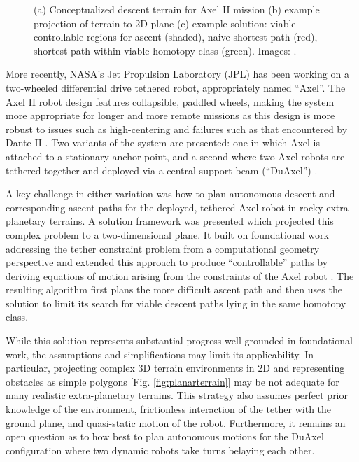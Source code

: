 \documentclass[12pt]{article}
\begin{document}
\begin{figure}
\begin{subfigure}{.2\textwidth}
    \caption{}
    \label{fig:planarpath}
  \end{subfigure}  %
  \label{fig:dsolution}
  \vspace{-0.1in}
  \caption{(a) Conceptualized descent terrain for Axel II mission (b) example projection of terrain to 2D plane
  (c) example solution: viable controllable regions for ascent (shaded), naive shortest path (red), shortest path within 
  viable homotopy class (green). Images: \cite{ axel_planning}. }
\end{figure}


More recently, NASA's Jet Propulsion Laboratory (JPL) has been working on a
two-wheeled differential drive tethered robot, appropriately named
``Axel''. The Axel II robot design features collapsible, paddled
wheels, making the system more appropriate for longer and more remote
missions as this design is more robust to issues such as
high-centering and failures such as that encountered by Dante II
\cite{axel_design}. Two variants of the system are
presented: one in which Axel is attached to a stationary anchor point,
and a second where two Axel robots are tethered together and deployed
via a central support beam (``DuAxel'') \cite{duaxel}.


A key challenge in either variation was how to plan autonomous
descent and corresponding ascent paths for the deployed, tethered Axel
robot in rocky extra-planetary terrains.  A solution
framework was presented which projected this complex problem to a
two-dimensional plane. It built on foundational work addressing the
tether constraint problem from a computational geometry perspective
\cite{ties_that_bind, min_homotopies} and extended this approach to
produce ``controllable'' paths by deriving equations of motion arising
from the constraints of the Axel robot \cite{axel_planning}. The
resulting algorithm first plans the more difficult ascent path and
then uses the solution to limit its search for viable descent paths
lying in the same homotopy class.


While this solution represents substantial progress well-grounded in
foundational work, the assumptions and simplifications may limit its
applicability. In particular, projecting complex 3D terrain
environments in 2D and representing obstacles as simple polygons
[Fig. \ref{fig:planarterrain}] may be not adequate for many realistic
extra-planetary terrains.  This strategy also assumes perfect prior
knowledge of the environment, frictionless interaction of the tether
with the ground plane, and quasi-static motion of the robot.
Furthermore, it remains an open question as to how best to plan
autonomous motions for the DuAxel configuration where two dynamic
robots take turns belaying each other.
\end{document}
